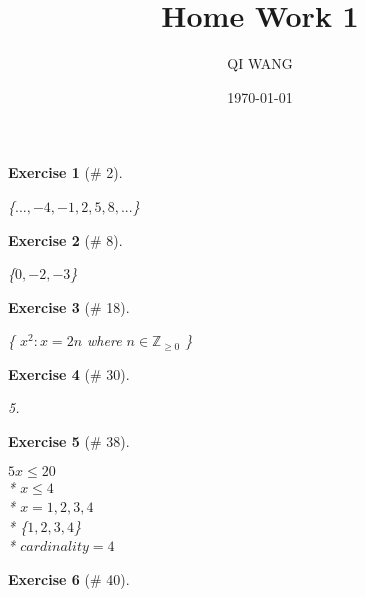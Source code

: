 \documentclass[12pt]{amsart}
\theoremstyle{break}
\newtheorem{exr}{Exercise}
\begin{document}

\title[HW 1]{Home Work 1}
\author[QI]{QI WANG}
\date{\today}
\maketitle

\begin{exr}[\# 2]
\ 
\begin{center}
\{$..., -4, -1, 2, 5, 8, ...$\}
\end{center}
\end{exr}

\begin{exr}[\# 8]
\ 
\begin{center}
\{$0, -2, -3$\}
\end{center}
\end{exr}

\begin{exr}[\# 18]
\ 
\begin{center}
\{ $x^2 : x = 2n$ where $n \in \mathbb Z_{\ge 0}$ \}
\end{center}
\end{exr}

\begin{exr}[\# 30]
\ 
\begin{center}
5.
\end{center}
\end{exr}

\begin{exr}[\# 38]
\ 
\begin{center}
$5x \leq 20$ \\*
$x \leq 4$ \\*
$x=1,2,3,4$ \\*
\{$1, 2, 3, 4$\} \\*
$cardinality = 4$
\end{center}
\end{exr}

\begin{exr}[\# 40]
\ \newline
{}
\end{exr}
\end{document}
